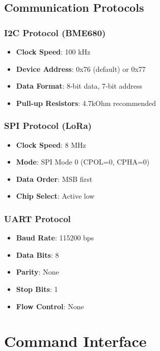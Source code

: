 \documentclass[11pt,a4paper]{article}
\begin{document}
\subsection{Communication Protocols}

\subsubsection{I2C Protocol (BME680)}
\begin{itemize}
    \item \textbf{Clock Speed}: 100 kHz
    \item \textbf{Device Address}: 0x76 (default) or 0x77
    \item \textbf{Data Format}: 8-bit data, 7-bit address
    \item \textbf{Pull-up Resistors}: 4.7kOhm recommended
\end{itemize}

\subsubsection{SPI Protocol (LoRa)}
\begin{itemize}
    \item \textbf{Clock Speed}: 8 MHz
    \item \textbf{Mode}: SPI Mode 0 (CPOL=0, CPHA=0)
    \item \textbf{Data Order}: MSB first
    \item \textbf{Chip Select}: Active low
\end{itemize}

\subsubsection{UART Protocol}
\begin{itemize}
    \item \textbf{Baud Rate}: 115200 bps
    \item \textbf{Data Bits}: 8
    \item \textbf{Parity}: None
    \item \textbf{Stop Bits}: 1
    \item \textbf{Flow Control}: None
\end{itemize}

\section{Command Interface}
\end{document}
